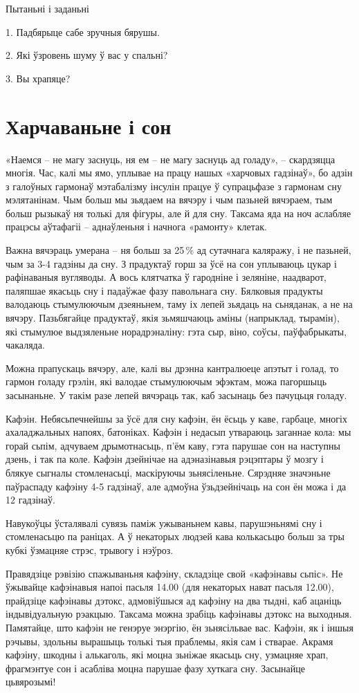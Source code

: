 Пытаньні і заданьні

1. Падбярыце сабе зручныя бярушы.

2. Які ўзровень шуму ў вас у спальні?

3. Вы храпяце?


\section{Харчаваньне і сон}

«Наемся – не магу заснуць, ня ем – не магу заснуць ад голаду», – скардзяцца многія. Час, калі мы ямо, уплывае на працу нашых «харчовых гадзінаў», бо адзін з галоўных гармонаў мэтабалізму інсулін працуе ў супрацьфазе з гармонам сну мэлятанінам. Чым больш мы зьядаем на вячэру і чым пазьней вячэраем, тым больш рызыкаў ня толькі для фігуры, але й для сну. Таксама яда на ноч аслабляе працэсы аўтафагіі – аднаўленьня і начнога «рамонту» клетак.

Важна вячэраць умерана – ня больш за 25\,\% ад сутачнага каляражу, і не пазьней, чым за 3-4 гадзіны да сну. З прадуктаў горш за ўсё на сон уплываюць цукар і рафінаваныя вугляводы. А вось клятчатка ў гародніне і зеляніне, наадварот, паляпшае якасьць сну і падаўжае фазу павольнага сну. Бялковыя прадукты валодаюць стымулюючым дзеяньнем, таму іх лепей зьядаць на сьняданак, а не на вячэру. Пазьбягайце прадуктаў, якія зьмяшчаюць аміны (напрыклад, тырамін), які стымулюе выдзяленьне норадрэналіну: гэта сыр, віно, соўсы, паўфабрыкаты, чакаляда.

Можна прапускаць вячэру, але, калі вы дрэнна кантралюеце апэтыт і голад, то гармон голаду грэлін, які валодае стымулюючым эфэктам, можа пагоршыць засынаньне. У такім разе лепей вячэраць так, каб засынаць без пачуцьця голаду.

Кафэін. Небясьпечнейшы за ўсё для сну кафэін, ён ёсьць у каве, гарбаце, многіх ахаладжальных напоях, батоніках. Кафэін і недасып утвараюць заганнае кола: мы горай сьпім, адчуваем дрымотнасьць, п'ём каву, гэта парушае сон на наступны дзень, і так па коле. Кафэін дзейнічае на адэназінавыя рэцэптары ў мозгу і блякуе сыгналы стомленасьці, маскіруючы зьнясіленьне. Сярэдняе значэньне паўраспаду кафэіну 4-5 гадзінаў, але адмоўна ўзьдзейнічаць на сон ён можа і да 12 гадзінаў.

Навукоўцы ўсталявалі сувязь паміж ужываньнем кавы, парушэньнямі сну і стомленасьцю па раніцах. А ў некаторых людзей кава колькасьцю больш за тры кубкі ўзмацняе стрэс, трывогу і нэўроз.

Правядзіце рэвізію спажываньня кафэіну, складзіце свой «кафэінавы сьпіс». Не ўжывайце кафэінавыя напоі пасьля 14.00 (для некаторых нават пасьля 12.00), прайдзіце кафэінавы дэтокс, адмовіўшыся ад кафэіну на два тыдні, каб ацаніць індывідуальную рэакцыю. Таксама можна зрабіць кафэінавы дэтокс на выходныя. Памятайце, што кафэін не генэруе энэргію, ён зьнясільвае вас. Кафэін, як і іншыя рэчывы, здольны вырашыць толькі тыя праблемы, якія сам і стварае. Акрамя кафэіну, шкодны і алькаголь, які моцна зьніжае якасьць сну, узмацняе храп, фрагмэнтуе сон і асабліва моцна парушае фазу хуткага сну. Засынайце цьвярозымі!

